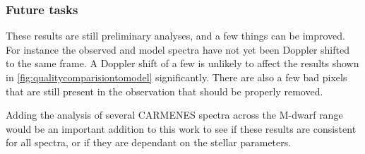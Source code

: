 \subsubsection{Future tasks}
\label{subsubsec:future_tasksaims}
These results are still preliminary analyses, and a few things can be improved.
For instance the observed and model spectra have not yet been Doppler shifted to the same frame.
A Doppler shift of a few \nm{} is unlikely to affect the results shown in \cref{fig:qualitycomparisiontomodel} significantly.
There are also a few bad pixels that are still present in the observation that should be properly removed.

Adding the analysis of several CARMENES spectra across the M-dwarf range would be an important addition to this work to see if these results are consistent for all spectra, or if they are dependant on the stellar parameters.
